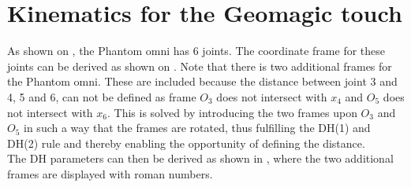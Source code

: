 \section{Kinematics for the Geomagic touch}

As shown on , the Phantom omni has 6 joints. The coordinate frame for these joints can be derived as shown on . Note that there is two additional frames for the Phantom omni. These are included because the distance between joint 3 and 4, 5 and 6, can not be defined as frame $O_3$ does not intersect with $x_4$ and $O_5$ does not intersect with $x_6$. This is solved by introducing the two frames upon $O_3$ and $O_5$ in such a way that the frames are rotated, thus fulfilling the DH(1) and DH(2) rule and thereby enabling the opportunity of defining the distance. \\
The \gls{DH} parameters can then be derived as shown in , where the two additional frames are displayed with roman numbers.




